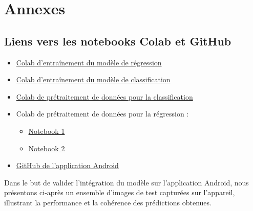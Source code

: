 \appendix
\chapter*{Annexes}

\section{Liens vers les notebooks Colab et GitHub}

\begin{itemize}
  \item \href{https://colab.research.google.com/drive/1WhaF2jE4ruWc6pByavec3E4Q6ijtsSvc?usp=sharing}{Colab d'entraînement du modèle de régression}

  \item \href{https://colab.research.google.com/drive/1iKeuTVjw6RtWP935TcWio7b9p6vjdsI0?usp=sharing}{Colab d'entraînement du modèle de classification}

  \item \href{https://colab.research.google.com/drive/1MJzRelOdtMpLDED62YKCTAENZ-j5BKGF?usp=sharing}{Colab de prétraitement de données pour la classification}

  \item Colab de prétraitement de données pour la régression : 
  \begin{itemize}
    \item \href{https://colab.research.google.com/drive/1aUlAik45c6v8C0GXGo_OrgLEPCQ-7mMI?usp=sharing}{Notebook 1}
    \item \href{https://colab.research.google.com/drive/1Xe0IfXKSYyPatz7qS6MPJhF55g3mx633?usp=sharing}{Notebook 2}
  \end{itemize}

  \item \href{https://github.com/Thisi47/bean_cooking_time_predictor.git}{GitHub de l'application Android}
\end{itemize}


Dans le but de valider l’intégration du modèle sur l’application Android, nous présentons ci-après un ensemble d’images de test capturées sur l’appareil, illustrant la performance et la cohérence des prédictions obtenues.

